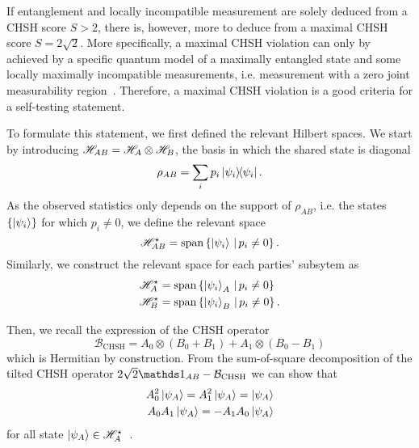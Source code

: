 If entanglement and locally incompatible measurement are solely deduced from a CHSH score $S>2$, there is, however, more to deduce from a maximal CHSH score $S=2\sqrt{2}$.
More specifically, a maximal CHSH violation can only by achieved by a specific quantum model of a maximally entangled state and some locally maximally incompatible measurements, i.e. measurement with a zero joint measurability region~\cite{Summers1987,Popescu92,Tsirelson1993}.
Therefore, a maximal CHSH violation is a good criteria for a self-testing statement.

To formulate this statement, we first defined the relevant Hilbert spaces.
We start by introducing $\mathscr{H}_{AB}= \mathscr{H}_A \otimes \mathscr{H}_B$, the basis in which the shared state is diagonal
\begin{equation}
	\rho_{AB} = \sum_i p_i \ketbra{\psi_i}	.
\end{equation}
As the observed statistics only depends on the support of $\rho_{AB}$, i.e. the states $\{\ket{\psi_i}\}$ for which $p_i\neq0$, we define the relevant space
\begin{equation}
	\mathscr{H}_{AB}^\star = \mathrm{span}\left\{ {\ket{\psi_i}\, | \, p_i \neq 0} \right\}.
\end{equation}
Similarly, we construct the relevant space for each parties' subsytem as
\begin{equation}
	\begin{split}
		\mathscr{H} _A^\star &= \mathrm{span}\left\{ {\ket{\psi_i}_A\, | \, p_i \neq 0} \right\} \\
		\mathscr{H} _B^\star &= \mathrm{span}\left\{ {\ket{\psi_i}_B\, | \, p_i \neq 0} \right\}.
	\end{split}
\end{equation}

Then, we recall the expression of the CHSH operator
\begin{equation}
	\mathcal{B}_{\mathrm{CHSH}} = A_0 \otimes \left( B_0 + B_1 \right) + A_1 \otimes \left( B_0 - B_1 \right)
\end{equation}
which is Hermitian by construction.
From the sum-of-square decomposition of the tilted CHSH operator $2\sqrt{2}\id_{AB} - \mathcal{B}_\text{CHSH}$ we can show that
\begin{align}
	A_0^2 \ket{\psi_A} = A_1^2 \ket{\psi_A} = \ket{\psi_A} \label{eq:involutory} \\
	A_0 A_1 \ket{\psi_A} = -A_1 A_0 \ket{\psi_A} \label{eq:anticom}
\end{align}
for all state $\ket{\psi_A} \in \mathscr{H}_A^\star$~\cite{Pironio2010,Supic2019}.

